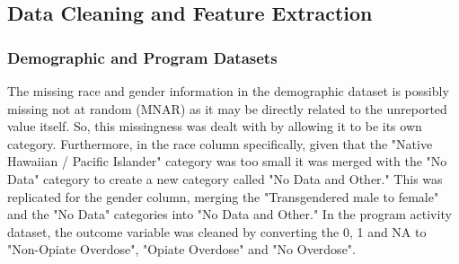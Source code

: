 \documentclass[twoside,10.5pt]{article}
\begin{document}
\subsection{Data Cleaning and Feature Extraction}
\subsubsection{Demographic and Program Datasets}
The missing race and gender information in the demographic dataset is possibly missing not at random (MNAR) as it may be directly related to the unreported value itself. So, this missingness was dealt with by allowing it to be its own category. Furthermore, in the race column specifically, given that the "Native Hawaiian / Pacific Islander" category was too small it was merged with the "No Data" category to create a new category called "No Data and Other." This was replicated for the gender column, merging the "Transgendered male to female" and the "No Data" categories into "No Data and Other."  In the program activity dataset, the outcome variable was cleaned by converting the 0, 1 and NA to "Non-Opiate Overdose", "Opiate Overdose" and "No Overdose". 
\end{document}
